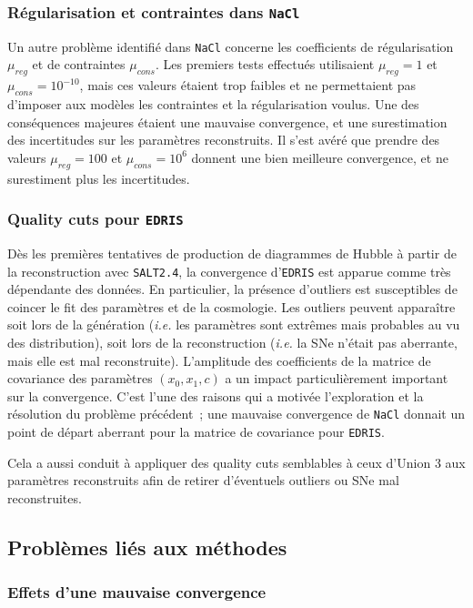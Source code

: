 \documentclass{book}
\def\nacl{\texttt{NaCl}\xspace}
\def\edris{\texttt{EDRIS}\xspace}
\def\saltd{\texttt{SALT2.4}\xspace}
\begin{document}
\subsubsection{Régularisation et contraintes dans \nacl}

Un autre problème identifié dans \nacl concerne les coefficients de régularisation $\mu_{reg}$ et de contraintes $\mu_{cons}$. Les premiers tests effectués utilisaient $\mu_{reg} = 1$ et $\mu_{cons} = 10^{-10}$, mais ces valeurs étaient trop faibles et ne permettaient pas d'imposer aux modèles les contraintes et la régularisation voulus. Une des conséquences majeures étaient une mauvaise convergence, et une surestimation des incertitudes sur les paramètres reconstruits.
Il s'est avéré que prendre des valeurs $\mu_{reg} = 100$ et $\mu_{cons} = 10^6$ donnent une bien meilleure convergence, et ne surestiment plus les incertitudes.

\subsubsection{Quality cuts pour \edris}
\label{sec:qc_edris}
Dès les premières tentatives de production de diagrammes de Hubble à partir de la reconstruction avec \saltd, la convergence d'\edris est apparue comme très dépendante des données. En particulier, la présence d'outliers est susceptibles de coincer le fit des paramètres et de la cosmologie. Les outliers peuvent apparaître soit lors de la génération (\textit{i.e.} les paramètres sont extrêmes mais probables au vu des distribution), soit lors de la reconstruction (\textit{i.e.} la SNe n'était pas aberrante, mais elle est mal reconstruite). L'amplitude des coefficients de la matrice de covariance des paramètres $(x_0, x_1, c)$ a un impact particulièrement important sur la convergence. C'est l'une des raisons qui a motivée l'exploration et la résolution du problème précédent~; une mauvaise convergence de \nacl donnait un point de départ aberrant pour la matrice de covariance pour \edris.

Cela a aussi conduit à appliquer des quality cuts semblables à ceux d'Union 3 aux paramètres reconstruits afin de retirer d'éventuels outliers ou SNe mal reconstruites.

\subsection{Problèmes liés aux méthodes}

\subsubsection{Effets d'une mauvaise convergence }
\end{document}
